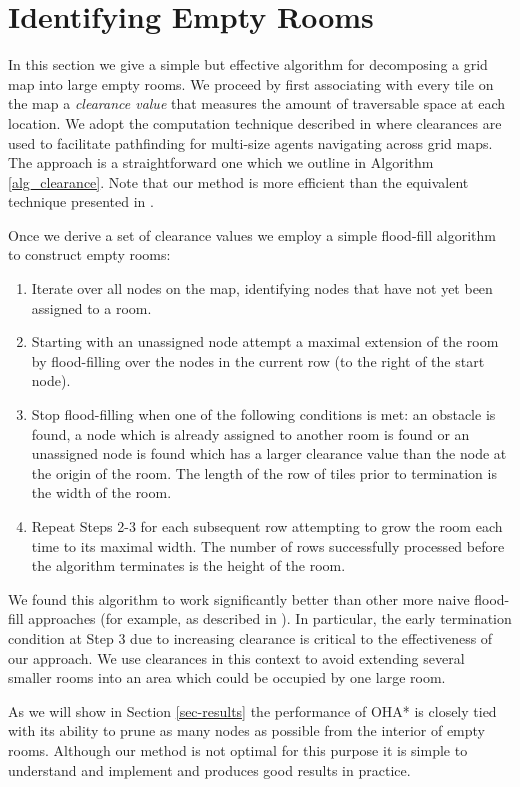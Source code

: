 \section{Identifying Empty Rooms}
In this section we give a simple but effective algorithm for decomposing a grid map
into large empty rooms.
We proceed by first associating with every tile on the map a \emph{clearance value} 
that measures the amount of traversable space at each location.
We adopt the computation technique described in \cite{harabor08} where clearances
are used to facilitate pathfinding for multi-size agents navigating across grid maps.
The approach is a straightforward one which we outline in Algorithm \ref{alg_clearance}.
Note that our method is more efficient than the equivalent technique presented
in \cite{harabor08}.



Once we derive a set of clearance values we employ a simple flood-fill algorithm to 
construct empty rooms:

\begin{enumerate}
\item{Iterate over all nodes on the map, identifying nodes that have not yet 
been assigned to a room.}
\item{Starting with an unassigned node attempt a maximal extension of the room
by flood-filling over the nodes in the current row (to the right of the start node).}
\item{Stop flood-filling when one of the following conditions is met: an obstacle is found,
a node which is already assigned to another room is found or an unassigned
node is found which has a larger clearance value than the node at the origin of the room.
The length of the row of tiles prior to termination is the width of the room.}
\item{Repeat Steps 2-3 for each subsequent row attempting to grow the room
each time to its maximal width.
The number of rows successfully processed before the algorithm terminates is the height of the room.}
\end{enumerate}

We found this algorithm to work significantly better than other more naive flood-fill
approaches (for example, as described in \cite{bjornsson06}). 
In particular, the early termination condition at Step 3 
due to increasing clearance is critical to the effectiveness of our approach.
We use clearances in this context to avoid extending several smaller rooms into an area which
could be occupied by one large room.

As we will show in Section \ref{sec-results} the performance of OHA* is closely
tied with its ability to prune as many nodes as possible from the interior of 
empty rooms. 
Although our method is not optimal for this purpose it is simple
to understand and implement and produces good results in practice.
